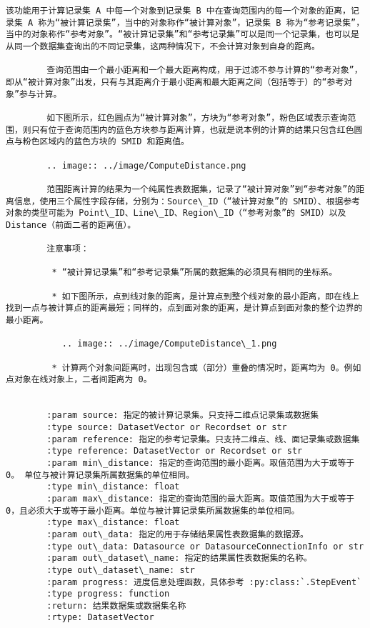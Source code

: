 \documentclass[11pt]{article}
\begin{document}
\begin{Verbatim}[commandchars=\\\{\}]
        该功能用于计算记录集 A 中每一个对象到记录集 B 中在查询范围内的每一个对象的距离，记录集 A 称为“被计算记录集”，当中的对象称作“被计算对象”，记录集 B 称为“参考记录集”，当中的对象称作“参考对象”。“被计算记录集”和“参考记录集”可以是同一个记录集，也可以是从同一个数据集查询出的不同记录集，这两种情况下，不会计算对象到自身的距离。
        
        查询范围由一个最小距离和一个最大距离构成，用于过滤不参与计算的“参考对象”，即从“被计算对象”出发，只有与其距离介于最小距离和最大距离之间（包括等于）的“参考对象”参与计算。
        
        如下图所示，红色圆点为“被计算对象”，方块为“参考对象”，粉色区域表示查询范围，则只有位于查询范围内的蓝色方块参与距离计算，也就是说本例的计算的结果只包含红色圆点与粉色区域内的蓝色方块的 SMID 和距离值。
        
        .. image:: ../image/ComputeDistance.png
        
        范围距离计算的结果为一个纯属性表数据集，记录了“被计算对象”到“参考对象”的距离信息，使用三个属性字段存储，分别为：Source\_ID（“被计算对象”的 SMID）、根据参考对象的类型可能为 Point\_ID、Line\_ID、Region\_ID（“参考对象”的 SMID）以及 Distance（前面二者的距离值）。
        
        注意事项：
        
         * “被计算记录集”和“参考记录集”所属的数据集的必须具有相同的坐标系。
        
         * 如下图所示，点到线对象的距离，是计算点到整个线对象的最小距离，即在线上找到一点与被计算点的距离最短；同样的，点到面对象的距离，是计算点到面对象的整个边界的最小距离。
        
           .. image:: ../image/ComputeDistance\_1.png
        
         * 计算两个对象间距离时，出现包含或（部分）重叠的情况时，距离均为 0。例如点对象在线对象上，二者间距离为 0。
        
        
        :param source: 指定的被计算记录集。只支持二维点记录集或数据集
        :type source: DatasetVector or Recordset or str
        :param reference: 指定的参考记录集。只支持二维点、线、面记录集或数据集
        :type reference: DatasetVector or Recordset or str
        :param min\_distance: 指定的查询范围的最小距离。取值范围为大于或等于 0。 单位与被计算记录集所属数据集的单位相同。
        :type min\_distance: float
        :param max\_distance: 指定的查询范围的最大距离。取值范围为大于或等于 0，且必须大于或等于最小距离。单位与被计算记录集所属数据集的单位相同。
        :type max\_distance: float
        :param out\_data: 指定的用于存储结果属性表数据集的数据源。
        :type out\_data: Datasource or DatasourceConnectionInfo or str
        :param out\_dataset\_name: 指定的结果属性表数据集的名称。
        :type out\_dataset\_name: str
        :param progress: 进度信息处理函数，具体参考 :py:class:`.StepEvent`
        :type progress: function
        :return: 结果数据集或数据集名称
        :rtype: DatasetVector
    

\end{Verbatim}
\end{document}
